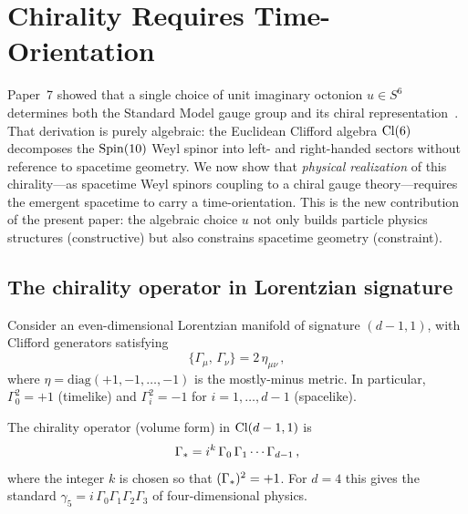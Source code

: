 
\section{Chirality Requires Time-Orientation}\label{sec:chirality}

Paper~7 showed that a single choice of unit imaginary octonion
$u\in S^6$ determines both the Standard Model gauge group and its
chiral representation~\cite{Paper7}.  That derivation is purely
algebraic: the Euclidean Clifford algebra $\mathrm{Cl}(6)$ decomposes the
$\mathrm{Spin}(10)$ Weyl spinor into left- and right-handed sectors without
reference to spacetime geometry.  We now show that \emph{physical
realization} of this chirality---as spacetime Weyl spinors coupling
to a chiral gauge theory---requires the emergent spacetime to carry a
time-orientation.  This is the new contribution of the present paper:
the algebraic choice $u$ not only builds particle physics structures
(constructive) but also constrains spacetime geometry (constraint).

\subsection{The chirality operator in Lorentzian signature}
\label{sec:chirality-lorentz}

Consider an even-dimensional Lorentzian manifold of signature
$(d{-}1,1)$, with Clifford generators satisfying
\begin{equation}\label{eq:clifford-lorentz}
  \{\Gamma_\mu,\, \Gamma_\nu\} = 2\,\eta_{\mu\nu}\,,
\end{equation}
where $\eta = \mathrm{diag}(+1,-1,\ldots,-1)$ is the mostly-minus
metric.  In particular, $\Gamma_0^2 = +1$ (timelike) and
$\Gamma_i^2 = -1$ for $i = 1,\ldots,d{-}1$ (spacelike).

The chirality operator (volume form) in $\mathrm{Cl}(d-1,1)$ is
\begin{equation}\label{eq:chirality-op}
  \Gamma_* = i^k\,\Gamma_0\,\Gamma_1 \cdots \Gamma_{d-1}\,,
\end{equation}
where the integer $k$ is chosen so that $(\Gamma_*)^2 = +1$.
For $d = 4$ this gives the standard $\gamma_5 = i\,\Gamma_0
\Gamma_1\Gamma_2\Gamma_3$ of four-dimensional physics.

